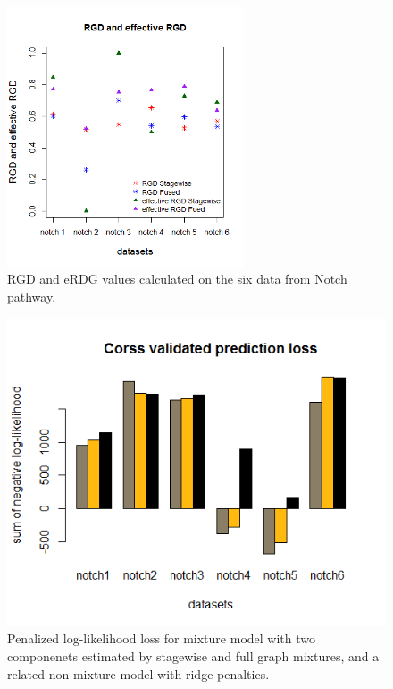 \documentclass[10pt]{article}
\begin{document}
\begin{figure}
\begin{center}
 \includegraphics[width=70mm]{RGD.png}
\end{center}
\caption{RGD and eRDG values calculated on the six data from Notch pathway.}
\label{fig:RGD}
\end{figure}


\begin{figure}
\begin{center}
 \includegraphics[width=120mm]{pll.png}
\end{center}
\caption{Penalized log-likelihood loss for mixture model with two componenets estimated by stagewise and full graph mixtures, and a related non-mixture model with ridge penalties.}
\label{fig:pll}
\end{figure}
\end{document}
